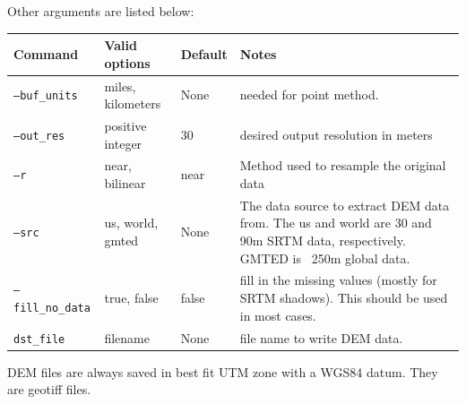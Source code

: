 \documentclass[12pt,oneside,final]{article}
\newif\ifgeocode
\begin{document}
\noindent
Other arguments are listed below:
\medskip
\noindent
\begin{center}
\begin{tabular}{| l | l | l | p{2.75in} |}
    \hline
    Command & Valid options & Default & Notes \\ \hline
    \texttt{--buf\_units} & miles, kilometers & None & needed for point 
                                                       \ifgeocode and
                                                      geocode methods.
                                                      \else method.\fi
                                                      \\ \hline
    \texttt{--out\_res} & positive integer & 30 & desired output resolution in
                                                  meters \\ \hline
    \texttt{--r} & near, bilinear & near & Method used to resample the original
                                           data \\ \hline
    \texttt{--src} & us, world, gmted & None & The data source to extract DEM
                                               data from.  The us and world are
                                               30 and 90m SRTM data,
                                               respectively. GMTED is ~250m
                                               global data.
                                               \\ \hline
    \texttt{--fill\_no\_data} & true, false & false & fill in the missing values
                                                   (mostly for SRTM shadows).
                                                   This should be used in most
                                                   cases. \\ \hline
    \texttt{dst\_file} & filename & None & file name to write DEM data. \\
                                           \hline
\end{tabular}
\end{center}
DEM files are always saved in best fit UTM zone with a WGS84 datum.  They are geotiff files.
\end{document}
